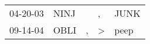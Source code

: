 \begin{supertabular}{p{0.07\textwidth}p{0.06\textwidth}p{0.02\textwidth}p{0.02\textwidth}p{0.06\textwidth}}
 04-20-03\textsuperscript{} &  NINJ\textsuperscript{} &    &             , &  JUNK\textsuperscript{} \\
 09-14-04\textsuperscript{} &  OBLI\textsuperscript{} &  , &  \textgreater &  peep\textsuperscript{} \\
\end{supertabular}
